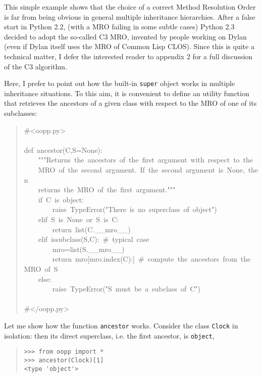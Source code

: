 \documentclass[10pt,english]{article}
\begin{document}
This simple example shows that the choice of a correct Method Resolution 
Order is far from being obvious in general multiple inheritance hierarchies. 
After a false start in Python 2.2, (with a MRO failing in some subtle cases)
Python 2.3 decided to adopt the so-called C3 MRO, invented by people working 
on Dylan (even if Dylan itself uses the MRO of Common Lisp CLOS). Since this 
is quite a technical matter, I defer the interested reader to appendix 2 
for a full discussion of the C3 algorithm.

Here, I prefer to point out how the built-in
\texttt{super} object works in multiple inheritance situations. To this aim, it 
is convenient to define an utility function that retrieves the ancestors
of a given class with respect to the MRO of one of its subclasses:
\begin{quote}
\begin{ttfamily}\begin{flushleft}
\mbox{{\#}<oopp.py>}\\
\mbox{}\\
\mbox{def~ancestor(C,S=None):}\\
\mbox{~~~~"""Returns~the~ancestors~of~the~first~argument~with~respect~to~the~}\\
\mbox{~~~~MRO~of~the~second~argument.~If~the~second~argument~is~None,~then~}\\
\mbox{~~~~returns~the~MRO~of~the~first~argument."""}\\
\mbox{~~~~if~C~is~object:}\\
\mbox{~~~~~~~~raise~TypeError("There~is~no~superclass~of~object")}\\
\mbox{~~~~elif~S~is~None~or~S~is~C:}\\
\mbox{~~~~~~~~return~list(C.{\_}{\_}mro{\_}{\_})}\\
\mbox{~~~~elif~issubclass(S,C):~{\#}~typical~case}\\
\mbox{~~~~~~~~mro=list(S.{\_}{\_}mro{\_}{\_})}\\
\mbox{~~~~~~~~return~mro[mro.index(C):]~{\#}~compute~the~ancestors~from~the~MRO~of~S}\\
\mbox{~~~~else:}\\
\mbox{~~~~~~~~raise~TypeError("S~must~be~a~subclass~of~C")}\\
\mbox{}\\
\mbox{{\#}</oopp.py>}
\end{flushleft}\end{ttfamily}
\end{quote}

Let me show how the function \texttt{ancestor} works. 
Consider the class \texttt{Clock} in isolation: then 
its direct superclass, i.e. the first ancestor, is \texttt{object},
\begin{quote}
\begin{verbatim}>>> from oopp import *
>>> ancestor(Clock)[1]
<type 'object'>\end{verbatim}
\end{quote}
\end{document}

